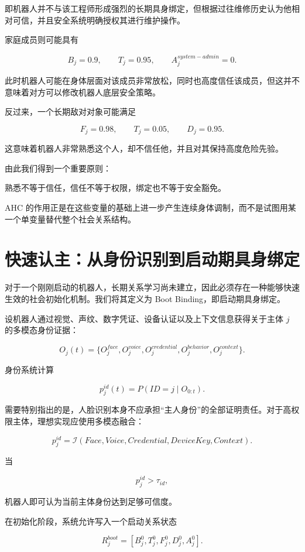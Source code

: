 即机器人并不与该工程师形成强烈的长期具身绑定，但根据过往维修历史认为他相对可信，并且安全系统明确授权其进行维护操作。

家庭成员则可能具有

\[
B_j=0.9,
\qquad
T_j=0.95,
\qquad
A_j^{system-admin}=0.
\]

此时机器人可能在身体层面对该成员非常放松，同时也高度信任该成员，但这并不意味着对方可以修改机器人底层安全策略。

反过来，一个长期敌对对象可能满足

\[
F_j=0.98,
\qquad
T_j=0.05,
\qquad
D_j=0.95.
\]

这意味着机器人非常熟悉这个人，却不信任他，并且对其保持高度危险先验。

由此我们得到一个重要原则：

\begin{proposition*}
熟悉不等于信任，信任不等于权限，绑定也不等于安全豁免。
\end{proposition*}

AHC 的作用正是在这些变量的基础上进一步产生连续身体调制，而不是试图用某一个单变量替代整个社会关系结构。


\section{快速认主：从身份识别到启动期具身绑定}

对于一个刚刚启动的机器人，长期关系学习尚未建立，因此必须存在一种能够快速生效的社会初始化机制。我们将其定义为 Boot Binding，即启动期具身绑定。

设机器人通过视觉、声纹、数字凭证、设备认证以及上下文信息获得关于主体 $j$ 的多模态身份证据：

\[
O_j(t)
=
\{
O_j^{face},
O_j^{voice},
O_j^{credential},
O_j^{behavior},
O_j^{context}
\}.
\]

身份系统计算

\[
p_j^{id}(t)
=
P(ID=j\mid O_{0:t}).
\]

需要特别指出的是，人脸识别本身不应承担“主人身份”的全部证明责任。对于高权限主体，理想实现应使用多模态融合：

\[
p_j^{id}
=
\mathcal I
\left(
Face,
Voice,
Credential,
DeviceKey,
Context
\right).
\]

当

\[
p_j^{id}>\tau_{id},
\]

机器人即可认为当前主体身份达到足够可信度。

在初始化阶段，系统允许写入一个启动关系状态

\[
R_j^{boot}
=
\left[
B_j^0,
T_j^0,
F_j^0,
D_j^0,
A_j^0
\right].
\]

